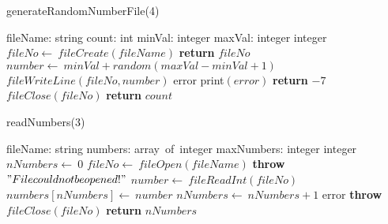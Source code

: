 \documentclass[a4paper,10pt]{article}
\begin{document}
\begin{algorithm}
\caption{generateRandomNumberFile(4)}
\begin{algorithmic}[5]
\State {}
\State {}
\State {}
\State {}
    \State fileName: string
    \State count: int
    \State minVal: integer
    \State maxVal: integer
  \EndDecl
    \State integer
  \EndDecl
  \State \(fileNo\gets\ fileCreate(fileName)\)
    \State \textbf{return} \(fileNo\)
  \EndIf
  \Try
      \State \(number\gets\ minVal+random(maxVal-minVal+1)\)
      \State \(fileWriteLine(fileNo,number)\)
    \EndFor
  \EndTry
  \Catch error
    \State \(\)print\((error)\)
    \State \textbf{return} \(-7\)
  \EndCatch %
  \Finally
    \State \(fileClose(fileNo)\)
  \EndFinally
  \State \textbf{return} \(count\)
\EndFunction
\end{algorithmic}
\end{algorithm}


\begin{algorithm}
\caption{readNumbers(3)}
\begin{algorithmic}[5]
\State {}
\State {}
\State {}
    \State fileName: string
    \State numbers: array\ of\ integer
    \State maxNumbers: integer
  \EndDecl
    \State integer
  \EndDecl
  \State \(nNumbers\gets\ 0\)
  \State \(fileNo\gets\ fileOpen(fileName)\)
    \State \textbf{throw} \("File could not be opened!"\)
  \EndIf
  \Try
      \State \(number\gets\ fileReadInt(fileNo)\)
      \State \(numbers[nNumbers]\gets\ number\)
      \State \(nNumbers\gets\ nNumbers+1\)
    \EndWhile
  \EndTry
  \Catch error
    \State \textbf{throw} \(\)
  \EndCatch %
  \Finally
    \State \(fileClose(fileNo)\)
  \EndFinally
  \State \textbf{return} \(nNumbers\)
\EndFunction
\end{algorithmic}
\end{algorithm}
\end{document}
